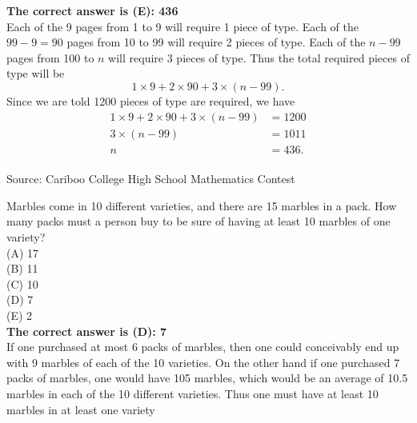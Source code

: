 \documentclass{article}
\begin{document}

\textbf{The correct answer is (E): 436}\\[1 ex]
Each of the 9 pages from 1 to 9 will require 1 piece of type. Each of the $99-9=90$ pages from 10 to 99 will require 2 pieces of type. Each of the $n-99$ pages from 100 to $n$ will require 3 pieces of type. Thus the total required pieces of type will be
\begin{equation*}
1\times9+2\times90+3\times(n-99).
\end{equation*}
Since we are told 1200 pieces of type are required, we have
\begin{align*}
1\times9+2\times90+3\times(n-99)&=1200\\
3\times(n-99)&=1011\\
n&=436.
\end{align*}
\\[5 ex]

\scriptsize
Source: Cariboo College High School Mathematics Contest

\normalsize
Marbles come in 10 different varieties, and there are 15 marbles in a pack. How many packs must a person buy to be sure of having at least 10 marbles of one variety?\\
(A) 17\\
(B) 11\\
(C) 10\\
(D) 7\\
(E) 2\\


\textbf{The correct answer is (D): 7}\\[1 ex]
If one purchased at most 6 packs of marbles, then one could conceivably end up with 9 marbles of each of the 10 varieties. On the other hand if one purchased 7 packs of marbles, one would have 105 marbles, which would be an average of 10.5 marbles in each of the 10 different varieties. Thus one must have at least 10 marbles in at least one variety
\\[5 ex]
\end{document}
